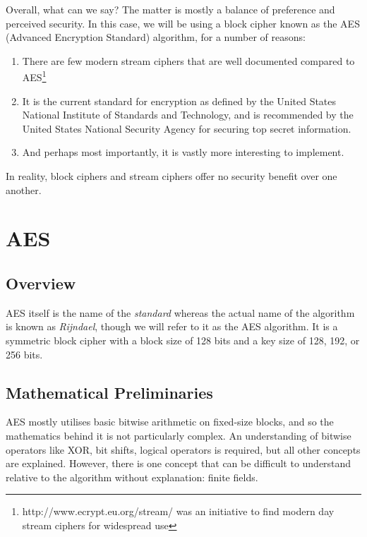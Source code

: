     Overall, what can we say? The matter is mostly a balance of preference and perceived security. In this case, we will be using a block cipher known as the AES (Advanced Encryption Standard) algorithm, for a number of reasons:
    
    \begin{enumerate}
      \item There are few modern stream ciphers that are well documented compared to AES\footnote{http://www.ecrypt.eu.org/stream/ was an initiative to find modern day stream ciphers for widespread use}
      \item It is the current standard for encryption as defined by the United States National Institute of Standards and Technology, and is recommended by the United States National Security Agency for securing top secret information.
      \item And perhaps most importantly, it is vastly more interesting to implement.
    \end{enumerate}
    
    In reality, block ciphers and stream ciphers offer no security benefit over one another.

\section{AES}
  \subsection{Overview}
  
  AES itself is the name of the \emph{standard} whereas the actual name of the algorithm is known as \emph{Rijndael}, though we will refer to it as the AES algorithm. It is a symmetric block cipher with a block size of 128 bits and a key size of 128, 192, or 256 bits. 
  
  \subsection{Mathematical Preliminaries}
  
  AES mostly utilises basic bitwise arithmetic on fixed-size blocks, and so the mathematics behind it is not particularly complex. An understanding of bitwise operators like XOR, bit shifts, logical operators is required, but all other concepts are explained. However, there is one concept that can be difficult to understand relative to the algorithm without explanation: finite fields.
  
